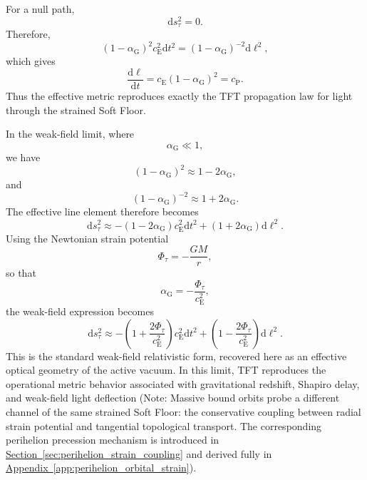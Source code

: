 For a null path,
\begin{equation}
    \mathrm{d}s_\tau^2 = 0.
\end{equation}
Therefore,
\begin{equation}
    (1-\alpha_{\mathrm{G}})^2 c_{\mathrm{E}}^2 \mathrm{d}t^2 = (1-\alpha_{\mathrm{G}})^{-2} \mathrm{d}\ell^2,
\end{equation}
which gives
\begin{equation}
    \frac{\mathrm{d}\ell}{\mathrm{d}t} = c_{\mathrm{E}}(1-\alpha_{\mathrm{G}})^2 = c_{\mathrm{P}}.
\end{equation}
Thus the effective metric reproduces exactly the TFT propagation law for light through the strained Soft Floor.

In the weak-field limit, where
\begin{equation}
    \alpha_{\mathrm{G}} \ll 1,
\end{equation}
we have
\begin{equation}
    (1-\alpha_{\mathrm{G}})^2 \approx 1-2\alpha_{\mathrm{G}},
\end{equation}
and
\begin{equation}
    (1-\alpha_{\mathrm{G}})^{-2} \approx 1+2\alpha_{\mathrm{G}}.
\end{equation}
The effective line element therefore becomes
\begin{equation}
    \mathrm{d}s_\tau^2 \approx -(1-2\alpha_{\mathrm{G}}) c_{\mathrm{E}}^2 \mathrm{d}t^2 + (1+2\alpha_{\mathrm{G}}) \mathrm{d}\ell^2 .
\end{equation}
Using the Newtonian strain potential
\begin{equation}
    \Phi_\tau = -\frac{GM}{r},
\end{equation}
so that
\begin{equation}
    \alpha_{\mathrm{G}} = -\frac{\Phi_\tau}{c_{\mathrm{E}}^2},
\end{equation}
the weak-field expression becomes
\begin{equation}
    \mathrm{d}s_\tau^2 \approx -\left( 1+\frac{2\Phi_\tau}{c_{\mathrm{E}}^2} \right) c_{\mathrm{E}}^2 \mathrm{d}t^2 + \left( 1-\frac{2\Phi_\tau}{c_{\mathrm{E}}^2} \right) \mathrm{d}\ell^2 .
\end{equation}
This is the standard weak-field relativistic form, recovered here as an effective optical geometry of the active vacuum. In this limit, TFT reproduces the operational metric behavior associated with gravitational redshift, Shapiro delay, and weak-field light deflection (Note: Massive bound orbits probe a different channel of the same strained Soft Floor: the conservative coupling between radial strain potential and tangential topological transport. The corresponding perihelion precession mechanism is introduced in \hyperref[sec:perihelion_strain_coupling]{Section~\ref*{sec:perihelion_strain_coupling}} and derived fully in \hyperref[app:perihelion_orbital_strain]{Appendix~\ref*{app:perihelion_orbital_strain}}).

